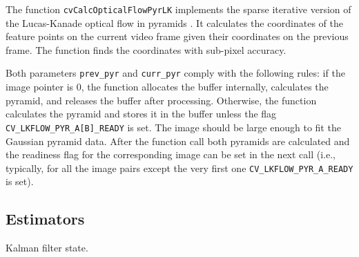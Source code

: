 The function \texttt{cvCalcOpticalFlowPyrLK} implements the sparse iterative version of the Lucas-Kanade optical flow in pyramids
. It calculates the coordinates of the feature points on the current video
frame given their coordinates on the previous frame. The function finds
the coordinates with sub-pixel accuracy.

Both parameters \texttt{prev\_pyr} and \texttt{curr\_pyr} comply with the
following rules: if the image pointer is 0, the function allocates the
buffer internally, calculates the pyramid, and releases the buffer after
processing. Otherwise, the function calculates the pyramid and stores
it in the buffer unless the flag \texttt{CV\_LKFLOW\_PYR\_A[B]\_READY}
is set. The image should be large enough to fit the Gaussian pyramid
data. After the function call both pyramids are calculated and the
readiness flag for the corresponding image can be set in the next call
(i.e., typically, for all the image pairs except the very first one
\texttt{CV\_LKFLOW\_PYR\_A\_READY} is set).

\ifC
\subsection{Estimators}

\label{CvKalman}

Kalman filter state.

